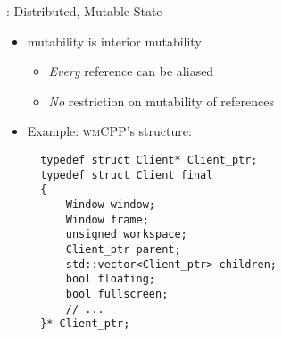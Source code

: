 \begin{frame}[fragile]{\underline{\cpp}: Distributed, Mutable State \hfill {\footnotesize \currentname}}

    \begin{itemize}

        \item {} mutability is interior mutability
            \begin{itemize}
                \item \textit{Every} reference can be aliased
                \item \textit{No} restriction on mutability of references
            \end{itemize}

        \item Example: \textsc{wmCPP}'s  structure:\\[3pt]
\begin{verbatim}
  typedef struct Client* Client_ptr;
  typedef struct Client final
  {
      Window window;
      Window frame;
      unsigned workspace;
      Client_ptr parent;
      std::vector<Client_ptr> children;
      bool floating;
      bool fullscreen;
      // ...
  }* Client_ptr;
\end{verbatim}

    \end{itemize}

    \vfill

\end{frame}

